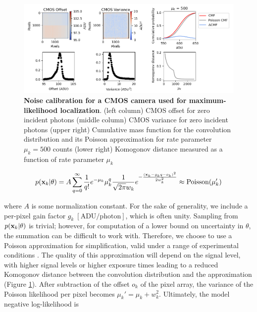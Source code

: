 \begin{figure}[t]
\begin{center}
\includegraphics[width=16cm]{media/Noise.png}
\end{center}
\caption{\textbf{Noise calibration for a CMOS camera used for maximum-likelihood localization}. (left column) CMOS offset for zero incident photons (middle column) CMOS variance for zero incident photons (upper right) Cumulative mass function for the convolution distribution and its Poisson approximation for rate parameter $\mu_{k} = 500$ counts (lower right) Komogonov distance measured as a function of rate parameter $\mu_{k}$}
\label{fig:fig2}
\end{figure}

\begin{equation}
p(\bold{x}_{k}\lvert\theta) = A\sum_{q=0}^{\infty} \frac{1}{q!}e^{-\mu_{k}}\mu_{k}^{q}\frac{1}{\sqrt{2\pi}w_{k}}e^{-\frac{(\bold{x}_{k}-g_{k}q-o_{k})^2}{2 w_{k}^{2}}} \approx \mathrm{Poisson}(\mu_{k}')
\end{equation}

where $A$ is some normalization constant. For the sake of generality, we include a per-pixel gain factor $g_{k} \; [\mathrm{ADU}/\mathrm{photon}]$, which is often unity. Sampling from $p(\bold{x}_{k}\lvert\theta)$ is trivial; however, for computation of a lower bound on uncertainty in $\theta$, the summation can be difficult to work with. Therefore, we choose to use a Poisson approximation for simplification, valid under a range of experimental conditions \parencite{Huang2013}. The quality of this approximation will depend on the signal level, with higher signal levels or higher exposure times leading to a reduced Komogonov distance between the convolution distribution and the approximation (Figure \ref{fig:fig2}). After subtraction of the offset $o_{k}$ of the pixel array, the variance of the Poisson likelihood per pixel  becomes $\mu_{k}' = \mu_{k} + w_{k}^{2}$. Ultimately, the model negative log-likelihood is


